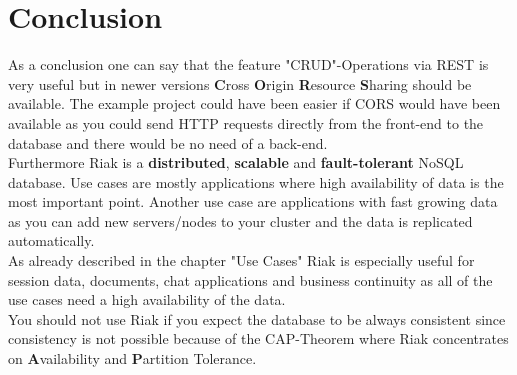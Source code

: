 \section{Conclusion}
As a conclusion one can say that the feature "CRUD"-Operations via REST is very useful but in newer versions \textbf{C}ross \textbf{O}rigin \textbf{R}esource \textbf{S}haring should be available. The example project could have been easier if CORS would have been available as you could send HTTP requests directly from the front-end to the database and there would be no need of a back-end. 
\\
Furthermore Riak is a \textbf{distributed}, \textbf{scalable} and \textbf{fault-tolerant} NoSQL database. Use cases are mostly applications where high availability of data is the most important point. Another use case are applications with fast growing data as you can add new servers/nodes to your cluster and the data is replicated automatically. 
\\
As already described in the chapter "Use Cases" Riak is especially useful for session data, documents, chat applications and business continuity as all of the use cases need a high availability of the data. 
\\
You should not use Riak if you expect the database to be always consistent since consistency is not possible because of the CAP-Theorem where Riak concentrates on \textbf{A}vailability and \textbf{P}artition Tolerance.	